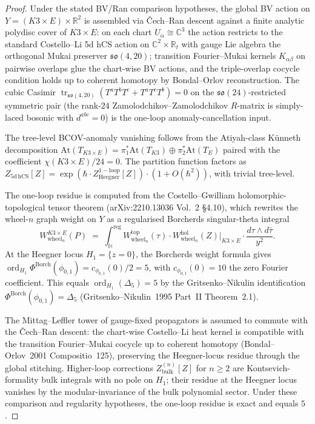 \begin{proof}
Under the stated BV/Ran comparison hypotheses, the global BV action on $Y = (K3 \times E) \times \mathbb{R}^2$ is assembled via \v{C}ech--Ran descent against a finite analytic polydisc cover of $K3 \times E$: on each chart $U_\alpha \cong \mathbb{C}^3$ the action restricts to the standard Costello--Li 5d hCS action on $\mathbb{C}^2 \times \mathbb{R}_t$ with gauge Lie algebra the orthogonal Mukai preserver $\mathfrak{so}(4, 20)$; transition Fourier--Mukai kernels $K_{\alpha\beta}$ on pairwise overlaps glue the chart-wise BV actions, and the triple-overlap cocycle condition holds up to coherent homotopy by Bondal--Orlov reconstruction. The cubic Casimir $\operatorname{tr}_{\mathfrak{so}(4, 20)}(T^a T^b T^c + T^a T^c T^b) = 0$ on the $\mathfrak{so}(24)$-restricted symmetric pair (the rank-$24$ Zamolodchikov--Zamolodchikov $R$-matrix is simply-laced bosonic with $d^{abc} = 0$) is the one-loop anomaly-cancellation input.

The tree-level BCOV-anomaly vanishing follows from the Atiyah-class K\"unneth decomposition $\mathrm{At}(T_{K3 \times E}) = \pi_1^* \mathrm{At}(T_{K3}) \oplus \pi_2^* \mathrm{At}(T_E)$ paired with the coefficient $\chi(K3 \times E)/24 = 0$. The partition function factors as $Z_{5\mathrm{d\,hCS}}[Z] = \exp(\hbar \cdot Z^{\mathrm{1-loop}}_{\mathrm{Heegner}}[Z]) \cdot (1 + O(\hbar^2))$, with trivial tree-level.

The one-loop residue is computed from the Costello--Gwilliam holomorphic-topological tensor theorem (arXiv:2210.13036 Vol.~2 \S4.10), which rewrites the wheel-$n$ graph weight on $Y$ as a regularised Borcherds singular-theta integral
\[
 W^{K3 \times E}_{\mathrm{wheel}_n}(P)
 \;=\; \int^{\mathrm{reg}}_{\mathbb{H}} W^{\mathrm{top}}_{\mathrm{wheel}_n}(\tau) \cdot W^{\mathrm{hol}}_{\mathrm{wheel}_n}(Z)\big|_{K3 \times E} \cdot \frac{d\tau \wedge d\bar\tau}{y^2}.
\]
At the Heegner locus $H_1 = \{z = 0\}$, the Borcherds weight formula gives $\operatorname{ord}_{H_1}\Phi^{\mathrm{Borch}}(\phi_{0,1}) = c_{\phi_{0,1}}(0)/2 = 5$, with $c_{\phi_{0,1}}(0) = 10$ the zero Fourier coefficient. This equals $\operatorname{ord}_{H_1}(\Delta_5) = 5$ by the Gritsenko--Nikulin identification $\Phi^{\mathrm{Borch}}(\phi_{0,1}) = \Delta_5$ (Gritsenko--Nikulin~1995 Part~II Theorem~2.1).

The Mittag--Leffler tower of gauge-fixed propagators is assumed to commute with the \v{C}ech--Ran descent: the chart-wise Costello--Li heat kernel is compatible with the transition Fourier--Mukai cocycle up to coherent homotopy (Bondal--Orlov~2001 Compositio~125), preserving the Heegner-locus residue through the global stitching. Higher-loop corrections $Z^{(n)}_{\mathrm{bulk}}[Z]$ for $n \geq 2$ are Kontsevich-formality bulk integrals with no pole on $H_1$; their residue at the Heegner locus vanishes by the modular-invariance of the bulk polynomial sector. Under these comparison and regularity hypotheses, the one-loop residue is exact and equals $5$.


\end{proof}
